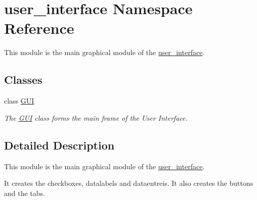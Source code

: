 \hypertarget{namespaceuser__interface}{}\section{user\+\_\+interface Namespace Reference}
\label{namespaceuser__interface}


This module is the main graphical module of the \hyperlink{namespaceuser__interface}{user\+\_\+interface}.  


\subsection*{Classes}
\begin{DoxyCompactItemize}
\item 
class \hyperlink{classuser__interface_1_1GUI}{G\+UI}
\begin{DoxyCompactList}\small\item\em The \hyperlink{classuser__interface_1_1GUI}{G\+UI} class forms the main frame of the User Interface. \end{DoxyCompactList}\end{DoxyCompactItemize}


\subsection{Detailed Description}
This module is the main graphical module of the \hyperlink{namespaceuser__interface}{user\+\_\+interface}. 

It creates the checkboxes, datalabels and dataentreis. It also creates the buttons and the tabs. 